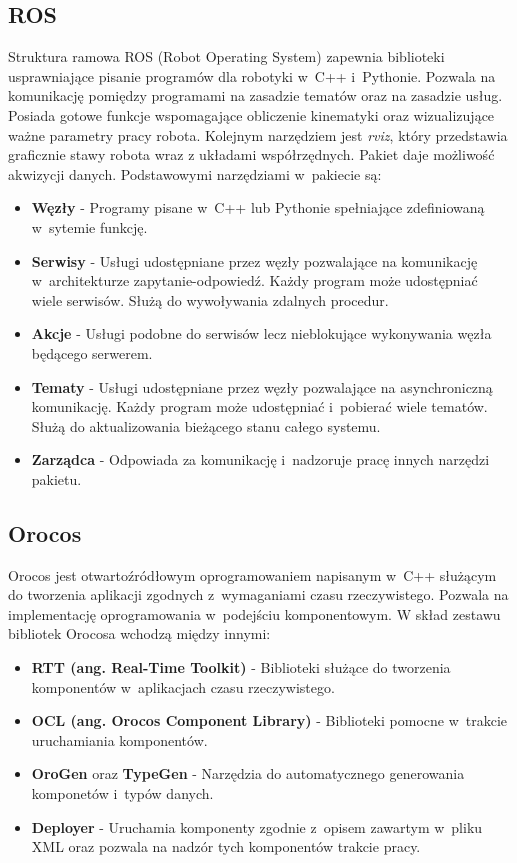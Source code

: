 	\subsection{ROS}
	Struktura ramowa ROS (Robot Operating System)\cite{bib:ROS} zapewnia biblioteki usprawniające pisanie programów dla robotyki w~C++ i~Pythonie. Pozwala na komunikację pomiędzy programami na zasadzie tematów oraz na zasadzie usług. Posiada gotowe funkcje wspomagające obliczenie kinematyki oraz wizualizujące ważne parametry pracy robota. Kolejnym narzędziem jest \textit{rviz}, który przedstawia graficznie stawy robota wraz z układami współrzędnych. Pakiet daje możliwość akwizycji danych. Podstawowymi narzędziami w~pakiecie są:
	\begin{itemize}
		\item \textbf{Węzły} - Programy pisane w~C++ lub Pythonie spełniające zdefiniowaną w~sytemie funkcję.
		\item \textbf{Serwisy} - Usługi udostępniane przez węzły pozwalające na komunikację w~architekturze zapytanie-odpowiedź. Każdy program może udostępniać wiele serwisów. Służą do wywoływania zdalnych procedur.
		\item \textbf{Akcje} - Usługi podobne do serwisów lecz nieblokujące wykonywania węzła będącego serwerem.
		\item \textbf{Tematy} - Usługi udostępniane przez węzły pozwalające na asynchroniczną komunikację. Każdy program może udostępniać i~pobierać wiele tematów. Służą do aktualizowania bieżącego stanu całego systemu.
		\item \textbf{Zarządca} - Odpowiada za komunikację i~nadzoruje pracę innych narzędzi pakietu.
	\end{itemize}
	\subsection{Orocos}
	Orocos \cite{bib:Orocos} jest otwartoźródłowym oprogramowaniem napisanym w~C++ służącym do tworzenia aplikacji zgodnych z~wymaganiami czasu rzeczywistego. Pozwala na implementację  oprogramowania w~podejściu komponentowym. W skład zestawu bibliotek Orocosa wchodzą między innymi:
	\begin{itemize}
		\item \textbf{RTT (ang. Real-Time Toolkit)} - Biblioteki służące do  tworzenia komponentów w~aplikacjach czasu rzeczywistego.
		\item \textbf{OCL (ang. Orocos Component Library)} - Biblioteki pomocne w~trakcie uruchamiania komponentów.
		\item \textbf{OroGen} oraz \textbf{TypeGen} - Narzędzia do automatycznego generowania komponetów i~typów danych.
		\item \textbf{Deployer} - Uruchamia komponenty zgodnie z~opisem zawartym w~pliku XML oraz pozwala na nadzór tych komponentów trakcie pracy.
	\end{itemize}
	
